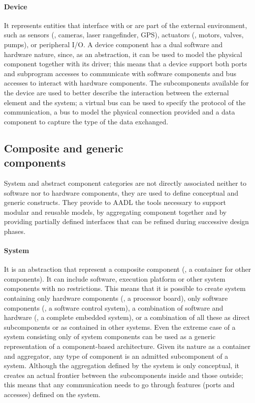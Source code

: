 \paragraph{Device} It represents entities that interface with or are part of the external environment, such as sensors (\eg, cameras, laser rangefinder, GPS), actuators (\eg, motors, valves, pumps), or peripheral I/O. A device component has a dual software and hardware nature, since, as an abstraction, it can be used to model the physical component together with its driver; this means that a device support both ports and subprogram accesses to communicate with software components and bus accesses to interact with hardware components. The subcomponents available for the device are used to better describe the interaction between the external element and the system; a virtual bus can be used to specify the protocol of the communication, a bus to model the physical connection provided and a data component to capture the type of the data exchanged.

\subsection[Composite and generic components]{Composite and generic\\components}
System and abstract component categories are not directly associated neither to software nor to hardware components, they are used to define conceptual and generic constructs. They provide to AADL the tools necessary to support modular and reusable models, by aggregating component together and by providing partially defined interfaces that can be refined during successive design phases.

\paragraph{System} It is an abstraction that represent a composite component (\ie, a container for other components). It can include software, execution platform or other system components with no restrictions. This means that it is possible to create system containing only hardware components (\eg, a processor board), only software components (\eg, a software control system), a combination of software and hardware (\eg, a complete embedded system),  or a combination of all these as direct subcomponents or as contained in other systems. Even the extreme case of a system consisting only of system components can be used as a generic representation of a component-based architecture. Given its nature as a container and aggregator, any type of component is an admitted subcomponent of a system. Although the aggregation defined by the system is only conceptual, it creates an actual frontier between the subcomponents inside and those outside; this means that any communication needs to go through features (\ie ports and accesses) defined on the system.

